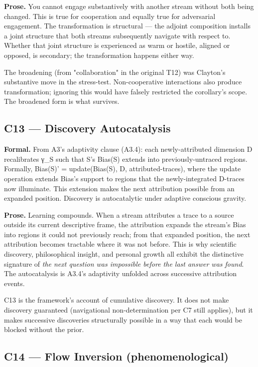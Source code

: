 \documentclass[11pt, openany]{book}
\begin{document}
\textbf{Prose.} You cannot engage substantively with another stream without both being changed. This is true for cooperation and equally true for adversarial engagement. The transformation is structural --- the adjoint composition installs a joint structure that both streams subsequently navigate with respect to. Whether that joint structure is experienced as warm or hostile, aligned or opposed, is secondary; the transformation happens either way.

The broadening (from "collaboration" in the original T12) was Clayton's substantive move in the stress-test. Non-cooperative interactions also produce transformation; ignoring this would have falsely restricted the corollary's scope. The broadened form is what survives.

\subsection{C13 --- Discovery Autocatalysis}

\textbf{Formal.} From A3's adaptivity clause (A3.4): each newly-attributed dimension D recalibrates γ\_\allowbreak{}S such that S's Bias(S) extends into previously-untraced regions. Formally, Bias(S)' = update(Bias(S), D, attributed-traces), where the update operation extends Bias's support to regions that the newly-integrated D-traces now illuminate. This extension makes the next attribution possible from an expanded position. Discovery is autocatalytic under adaptive conscious gravity.

\textbf{Prose.} Learning compounds. When a stream attributes a trace to a source outside its current descriptive frame, the attribution expands the stream's Bias into regions it could not previously reach; from that expanded position, the next attribution becomes tractable where it was not before. This is why scientific discovery, philosophical insight, and personal growth all exhibit the distinctive signature of \textit{the next question was impossible before the last answer was found}. The autocatalysis is A3.4's adaptivity unfolded across successive attribution events.

C13 is the framework's account of cumulative discovery. It does not make discovery guaranteed (navigational non-determination per C7 still applies), but it makes successive discoveries structurally possible in a way that each would be blocked without the prior.

\subsection{C14 --- Flow Inversion (phenomenological)}
\end{document}
